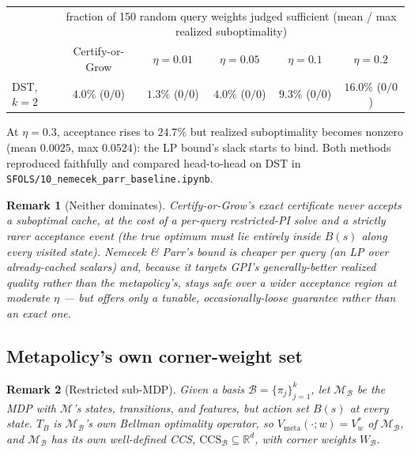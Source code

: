 \documentclass[11pt]{article}
\newtheorem{remark}{Remark}
\begin{document}
\begin{center}
\begin{tabular}{lccccc}
\toprule
 & \multicolumn{5}{c}{fraction of 150 random query weights judged sufficient (mean / max realized suboptimality)} \\
 & Certify-or-Grow & $\eta=0.01$ & $\eta=0.05$ & $\eta=0.1$ & $\eta=0.2$ \\
\midrule
DST, $k=2$ & $4.0\%$ ($0/0$) & $1.3\%$ ($0/0$) & $4.0\%$ ($0/0$) & $9.3\%$ ($0/0$) & $16.0\%$ ($0/0$) \\
\bottomrule
\end{tabular}
\end{center}
At $\eta=0.3$, acceptance rises to $24.7\%$ but realized suboptimality becomes nonzero (mean $0.0025$, max $0.0524$):
the LP bound's slack starts to bind. Both methods reproduced faithfully and compared head-to-head on DST in
\texttt{SFOLS/10\_nemecek\_parr\_baseline.ipynb}.

\begin{remark}[Neither dominates]
Certify-or-Grow's exact certificate never accepts a suboptimal cache, at the cost of a per-query restricted-PI solve
and a strictly rarer acceptance event (the true optimum must lie entirely inside $B(s)$ along every visited state).
Nemecek \& Parr's bound is cheaper per query (an LP over already-cached scalars) and, because it targets GPI's
generally-better realized quality rather than the metapolicy's, stays safe over a wider acceptance region at moderate
$\eta$ — but offers only a tunable, occasionally-loose guarantee rather than an exact one.
\end{remark}

\subsection{Metapolicy's own corner-weight set}\label{sec:meta-ccs}


\begin{remark}[Restricted sub-MDP]
Given a basis $\mathcal B=\{\pi_j\}_{j=1}^k$, let $\mathcal M_{\mathcal B}$ be the MDP with $\mathcal M$'s states, transitions, and features, but action set $B(s)$ at every state. $T_B$ \emph{is} $\mathcal M_{\mathcal B}$'s own Bellman optimality operator, so $V_{\mathrm{meta}}(\cdot;w)=V^*_w$ of $\mathcal M_{\mathcal B}$, and $\mathcal M_{\mathcal B}$ has its own well-defined CCS, $\mathrm{CCS}_{\mathcal B}\subseteq\mathbb R^d$, with corner weights
$W_{\mathcal B}$.
\end{remark}
\end{document}

